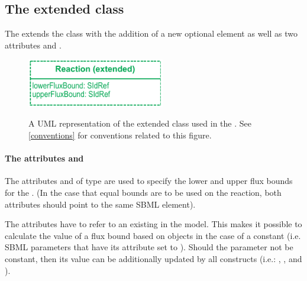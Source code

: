 
\begin{newsection}
\subsection{The extended  class}
\label{reaction-class-ga}

The \FBCPackage extends the \sbmlthreecore \Reaction class with the addition of 
a new optional element \GeneProteinAssociation as well as two attributes
 and .

\begin{figure}[h]
  \centering
  \includegraphics[width=6cm]{images/v2harmony_fbc_reaction.pdf}\\
  \caption{A UML representation of the extended \SBML \Reaction class used in
  the \FBCPackage. See \ref{conventions} for conventions related to this
  figure.}
  \label{fig:fbc_uml_reaction}
\end{figure}

\paragraph{The attributes  and }
The attributes  and  of type 
 are used to specify the lower and upper flux bounds for the 
\Reaction. (In the case that equal bounds are to be used on the reaction, both 
attributes should point to the same SBML element).

The attributes have to refer to an existing \Parameter in the model. This makes 
it possible to calculate the value of a flux bound based on \InitialAssignment 
objects in the case of a constant \Parameter (i.e. SBML parameters that have its 
 attribute set to \value{true}). Should the parameter not be 
constant, then its value can be additionally updated by all \sbmlthreecore constructs 
(i.e.: \EventAssignment, \AssignmentRule, and \AlgebraicRule).


\end{newsection}
